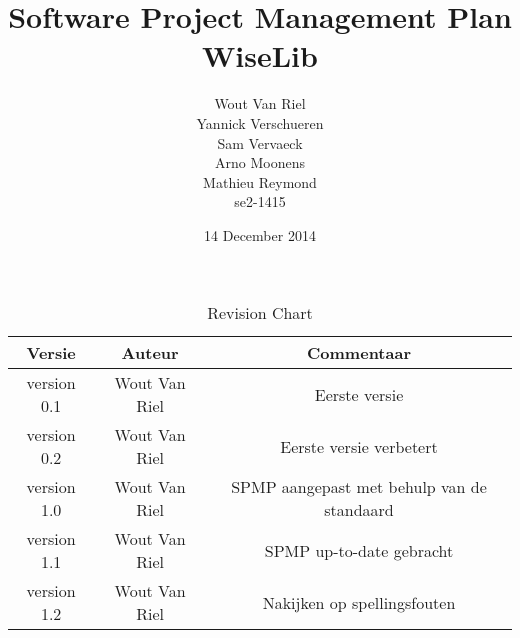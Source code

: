 \documentclass{article}
\begin{document}
\begin{titlepage}
\title{Software Project Management Plan \\ WiseLib}
\date{14 December 2014}
\author{Wout Van Riel \\ Yannick Verschueren \\ Sam Vervaeck \\ Arno Moonens \\ Mathieu Reymond \\ se2-1415}
\end{titlepage}

\maketitle

\newpage
\tableofcontents

\newpage

\begin{table}[h]
\centering
\begin{tabular}{c|c|c}
Versie & Auteur & Commentaar \\
\hline
 version 0.1 & Wout Van Riel & Eerste versie\\
 version 0.2 & Wout Van Riel & Eerste versie verbetert\\
 version 1.0 & Wout Van Riel & SPMP aangepast met behulp van de standaard \\
 version 1.1 & Wout Van Riel & SPMP up-to-date gebracht \\
 version 1.2 & Wout Van Riel & Nakijken op spellingsfouten

\end{tabular}

\caption{Revision Chart}
\label{tab:revchart}
\end{table}













\end{document}
